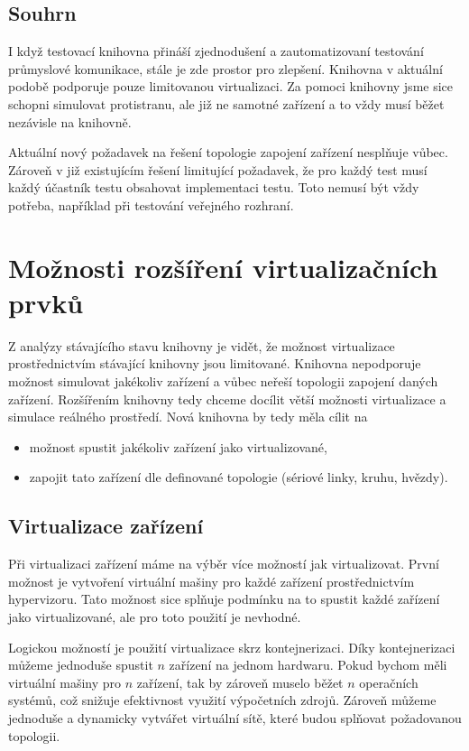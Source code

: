 \subsection{Souhrn}

I když testovací knihovna přináší zjednodušení a zautomatizovaní testování průmyslové komunikace, stále je zde prostor pro zlepšení. Knihovna v aktuální podobě podporuje pouze limitovanou virtualizaci. Za pomoci knihovny jsme sice schopni simulovat protistranu, ale již ne samotné zařízení a to vždy musí běžet nezávisle na knihovně. 

Aktuální nový požadavek na řešení topologie zapojení zařízení nesplňuje vůbec. Zároveň v již existujícím řešení limitující požadavek, že pro každý test musí každý účastník testu obsahovat implementaci testu. Toto nemusí být vždy potřeba, například při testování veřejného rozhraní.

\section{Možnosti rozšíření virtualizačních prvků}

Z analýzy stávajícího stavu knihovny je vidět, že možnost virtualizace prostřednictvím stávající knihovny jsou limitované. Knihovna nepodporuje možnost simulovat jakékoliv zařízení a vůbec neřeší topologii zapojení daných zařízení. Rozšířením knihovny tedy chceme docílit větší možnosti virtualizace a simulace reálného prostředí. Nová knihovna by tedy měla cílit na

\begin{itemize}
    \item možnost spustit jakékoliv zařízení jako virtualizované,
    \item zapojit tato zařízení dle definované topologie (sériové linky, kruhu, hvězdy).
\end{itemize}


\subsection{Virtualizace zařízení}

Při virtualizaci zařízení máme na výběr více možností jak virtualizovat. První možnost je vytvoření virtuální mašiny pro každé zařízení prostřednictvím hypervizoru. Tato možnost sice splňuje podmínku na to spustit každé zařízení jako virtualizované, ale pro toto použití je nevhodné. 

Logickou možností je použití virtualizace skrz kontejnerizaci. Díky kontejnerizaci můžeme jednoduše spustit $n$ zařízení na jednom hardwaru. Pokud bychom měli virtuální mašiny pro $n$ zařízení, tak by zároveň muselo běžet $n$ operačních systémů, což snižuje efektivnost využití výpočetních zdrojů. Zároveň můžeme jednoduše a dynamicky vytvářet virtuální sítě, které budou splňovat požadovanou topologii. 

